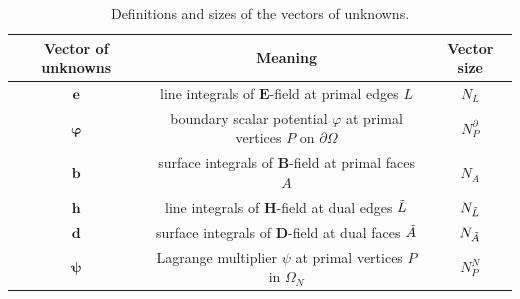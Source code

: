 \documentclass{article}
\begin{document}
\begin{table}[]
    \centering
\begin{tabular}{c c c}
     \hline
     Vector of unknowns  & Meaning  & Vector size \\
     \hline
     $\mathbf{e}$ & line integrals of $\mathbf{E}$-field at primal edges $L$& $N_L$ \\
     $\bm{\varphi}$ & boundary scalar potential $\varphi$ at primal vertices $P$ on $\partial\Omega$ & $N_P^\partial$ \\
     $\mathbf{b}$ & surface integrals of $\mathbf{B}$-field at primal faces $A$ & $N_A$ \\
     $\mathbf{h}$ & line integrals of $\mathbf{H}$-field at dual edges $\Tilde{L}$ & $N_{\Tilde{L}}$ \\
     $\mathbf{d}$ & surface integrals of $\mathbf{D}$-field at dual faces $\Tilde{A}$ & $N_{\Tilde{A}}$ \\
     $\bm{\psi}$ & Lagrange multiplier $\psi$ at primal vertices $P$ in $\Omega_N$ & $N^{N}_P$\\ 
     \hline
\end{tabular}
    \caption{Definitions and sizes of the vectors of unknowns.}
    \label{tab:def_size_var}
\end{table}
\end{document}
